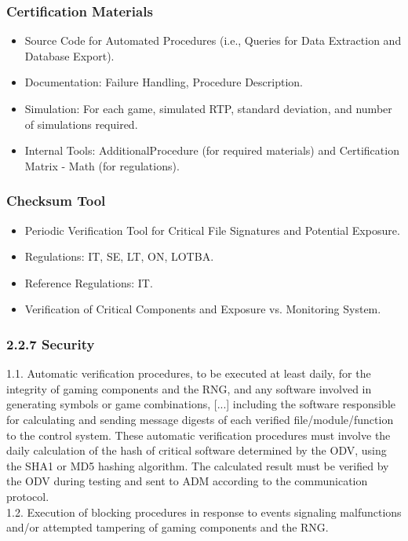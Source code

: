 \documentclass{beamer}
\begin{document}
\begin{frame}
\frametitle{Certification Materials}
\begin{itemize}
\item<1-> Source Code for Automated Procedures (i.e., Queries for Data Extraction and Database Export).
\item<2-> Documentation: Failure Handling, Procedure Description.
\item<3-> Simulation: For each game, simulated RTP, standard deviation, and number of simulations required.
\item<3-> Internal Tools: AdditionalProcedure (for required materials) and Certification Matrix - Math (for regulations).
\end{itemize}
\end{frame}

\begin{frame}
\frametitle{Checksum Tool}
\begin{itemize}
\item<1-> Periodic Verification Tool for Critical File Signatures and Potential Exposure.
\item<2-> Regulations: IT, SE, LT, ON, LOTBA.
\item<3-> Reference Regulations: IT.
\item<4-> Verification of Critical Components and Exposure vs. Monitoring System.
\end{itemize}
\end{frame}

\begin{frame}
\frametitle{2.2.7 Security}
1.1. Automatic verification procedures, to be executed at least daily, for the integrity of gaming components and the RNG, and any software involved in generating symbols or game combinations, [...] including the software responsible for calculating and sending message digests of each verified file/module/function to the control system. These automatic verification procedures must involve the daily calculation of the hash of critical software determined by the ODV, using the SHA1 or MD5 hashing algorithm. The calculated result must be verified by the ODV during testing and sent to ADM according to the communication protocol.\\
1.2. Execution of blocking procedures in response to events signaling malfunctions and/or attempted tampering of gaming components and the RNG.
\end{frame}
\end{document}
